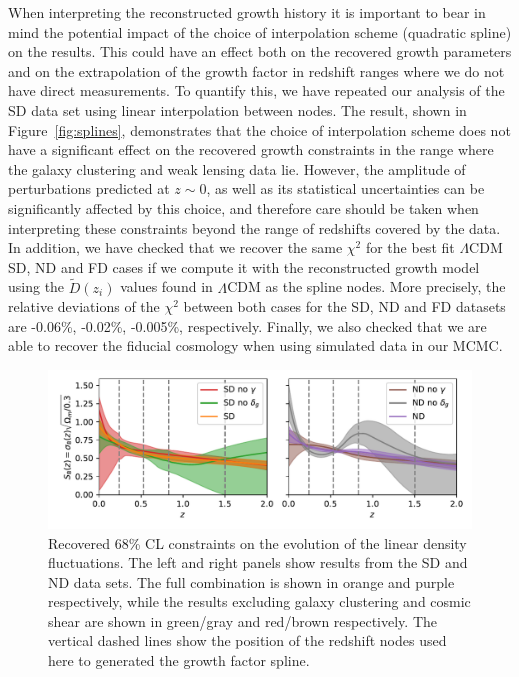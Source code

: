 \documentclass[a4paper,11pt]{article}
\newcommand{\lcdm}{$\Lambda$CDM\xspace}
\newcommand{\northd}{ND\xspace}
\newcommand{\southd}{SD\xspace}
\newcommand{\alld}{FD\xspace}
\begin{document}
      When interpreting the reconstructed growth history it is important to bear in mind the potential impact of the choice of interpolation scheme (quadratic spline) on the results. This could have an effect both on the recovered growth parameters and on the extrapolation of the growth factor in redshift ranges where we do not have direct measurements. To quantify this, we have repeated our analysis of the \southd data set using linear interpolation between nodes. The result, shown in Figure~\ref{fig:splines}, demonstrates that the choice of interpolation scheme does not have a significant effect on the recovered growth constraints in the range where the galaxy clustering and weak lensing data lie. However, the amplitude of perturbations predicted at $z\sim0$, as well as its statistical uncertainties can be significantly affected by this choice, and therefore care should be taken when interpreting these constraints beyond the range of redshifts covered by the data. In addition, we have checked that we recover the same $\chi^2$ for the best fit \lcdm \southd, \northd and \alld cases if we compute it with the reconstructed growth model using the $\tilde{D}(z_i)$ values found in \lcdm as the spline nodes. More precisely, the relative deviations of the $\chi^2$ between both cases for the \southd, \northd and \alld datasets are -0.06\%, -0.02\%, -0.005\%, respectively. Finally, we also checked that we are able to recover the fiducial cosmology when using simulated data in our MCMC.
      \begin{figure}
        \centering
        \includegraphics[width=\textwidth]{figures/ND_SD_s8z.pdf}
        \caption{Recovered 68\% CL constraints on the evolution of the linear density fluctuations. The left and right panels show results from the \southd and \northd data sets. The full combination is shown in orange and purple respectively, while the results excluding galaxy clustering and cosmic shear are shown in green/gray and red/brown respectively. The vertical dashed lines show the position of the redshift nodes used here to generated the growth factor spline.}
        \label{fig:ND_SD_s8z}
      \end{figure}
\end{document}
